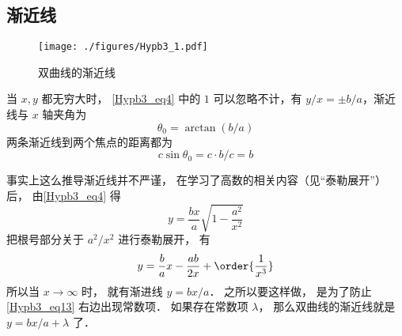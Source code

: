 \subsection{渐近线}
\begin{figure}[ht]
\centering
\texttt{[image: ./figures/Hypb3\_1.pdf]}
\caption{双曲线的渐近线} \label{Hypb3_fig1}
\end{figure}

当 $x,y$ 都无穷大时， \autoref{Hypb3_eq4} 中的 $1$ 可以忽略不计，有 $y/x = \pm b/a$，渐近线与 $x$ 轴夹角为
\begin{equation}
\theta_0 = \arctan(b/a)
\end{equation}
两条渐近线到两个焦点的距离都为
\begin{equation}\label{Hypb3_eq11}
c\sin\theta_0 = c\cdot b/c = b
\end{equation}

事实上这么推导渐近线并不严谨， 在学习了高数的相关内容（见“泰勒展开”）后， 由\autoref{Hypb3_eq4} 得
\begin{equation}
y = \frac{bx}{a} \sqrt{1-\frac{a^2}{x^2}}
\end{equation}
把根号部分关于 $a^2/x^2$ 进行泰勒展开， 有
\begin{equation}\label{Hypb3_eq13}
y = \frac ba x - \frac{ab}{2x} + \order{\frac{1}{x^3}}
\end{equation}
所以当 $x\to\infty$ 时， 就有渐进线 $y = bx/a$． 之所以要这样做， 是为了防止\autoref{Hypb3_eq13} 右边出现常数项． 如果存在常数项 $\lambda$， 那么双曲线的渐近线就是 $y = bx/a + \lambda$ 了．











